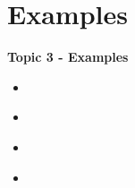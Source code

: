 \documentclass[fleqn]{beamer} %
\newcommand{\sectionIVtitle}{Examples}
\newcommand{\sectionIIIsubsectionIItitle}{}
\newcommand{\sectionIIIsubsectionIIItitle}{}
\newcommand{\sectionIIIsubsectionIVtitle}{}
\newcommand{\sectionIVsubsectionItitle}{}
\newcommand{\sectionIVsubsectionIItitle}{}
\newcommand{\sectionIVsubsectionIIItitle}{}
\newcommand{\sectionIVsubsectionIVtitle}{}
\begin{document}
			\begin{frame}
				\frametitle{\sectionIIIsubsectionIItitle}
				\bigskip
				

				\btVFill
			\end{frame}


		\subsection{\sectionIIIsubsectionIIItitle}\label{sectionIIIsubsectionIII}

			\begin{frame}
				\frametitle{\sectionIIIsubsectionIIItitle}
				\bigskip


				\btVFill
			\end{frame}

			\begin{frame}
				\frametitle{\sectionIIIsubsectionIIItitle}
				\bigskip


				\btVFill
			\end{frame}


		\subsection{\sectionIIIsubsectionIVtitle}\label{sectionIIIsubsectionIV}

			\begin{frame}
				\frametitle{\sectionIIIsubsectionIVtitle}
				\bigskip


				\btVFill
			\end{frame}	

			\begin{frame}
				\frametitle{\sectionIIIsubsectionIVtitle} \small
				\bigskip


				\btVFill
			\end{frame}	

	
	\section{\sectionIVtitle}\label{sectionIV}

		\begin{frame}
			\large \textbf{Topic 3 - \sectionIVtitle} \vspace{3mm}\\

			\begin{itemize}
				\item \hyperlink{sectionIVsubsectionI}{\sectionIVsubsectionItitle} \vspc %
				\item \hyperlink{sectionIVsubsectionII}{\sectionIVsubsectionIItitle} \vspc %
				\item \hyperlink{sectionIVsubsectionIII}{\sectionIVsubsectionIIItitle} \vspc %
				\item \hyperlink{sectionIVsubsectionIV}{\sectionIVsubsectionIVtitle} \vspc %
			\end{itemize}

		\end{frame}
\end{document}
